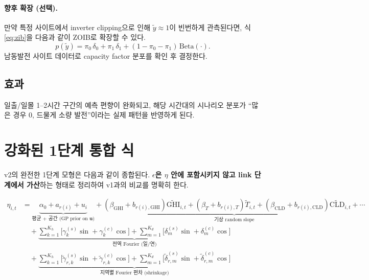 \documentclass[11pt,a4paper]{article}
\begin{document}
\paragraph{향후 확장 (선택).} 만약 특정 사이트에서 inverter clipping으로 인해 $\tilde y \approx 1$이 빈번하게 관측된다면, 식 \eqref{eq:zib}을 다음과 같이 ZOIB로 확장할 수 있다.
\begin{equation*}
    p(\tilde y) = \pi_0\,\delta_0 + \pi_1\,\delta_1 + (1-\pi_0-\pi_1)\,\mathrm{Beta}(\cdot).
\end{equation*}
남동발전 사이트 데이터로 capacity factor 분포를 확인 후 결정한다.

\subsection{효과}

일출/일몰 1--2시간 구간의 예측 편향이 완화되고, 해당 시간대의 시나리오 분포가 ``많은 경우 0, 드물게 소량 발전''이라는 실제 패턴을 반영하게 된다.

\section{강화된 1단계 통합 식}

v2의 완전한 1단계 모형은 다음과 같이 종합된다. \textbf{$\epsilon$은 $\eta$ 안에 포함시키지 않고 link 단계에서 가산}하는 형태로 정리하여 v1과의 비교를 명확히 한다.

\begin{align}
    \eta_{i,t} &= \underbrace{\alpha_0 + a_{r(i)} + u_i}_{\text{평균 + 공간 (GP prior on } \bm u)}
    + \underbrace{(\beta_{\mathrm{GHI}} + b_{r(i),\mathrm{GHI}})\widetilde{\mathrm{GHI}}_{i,t} + (\beta_T + b_{r(i),T})\widetilde T_{i,t} + (\beta_{\mathrm{CLD}}+b_{r(i),\mathrm{CLD}})\widetilde{\mathrm{CLD}}_{i,t} + \cdots}_{\text{기상 random slope}} \nonumber\\
    &\quad + \underbrace{\sum_{k=1}^{K_h}\bigl[\gamma_k^{(s)}\sin + \gamma_k^{(c)}\cos\bigr] + \sum_{m=1}^{K_d}\bigl[\delta_m^{(s)}\sin + \delta_m^{(c)}\cos\bigr]}_{\text{전역 Fourier (일/연)}} \nonumber\\
    &\quad + \underbrace{\sum_{k=1}^{K_h}\bigl[\tilde\gamma_{r,k}^{(s)}\sin + \tilde\gamma_{r,k}^{(c)}\cos\bigr] + \sum_{m=1}^{K_d}\bigl[\tilde\delta_{r,m}^{(s)}\sin + \tilde\delta_{r,m}^{(c)}\cos\bigr]}_{\text{지역별 Fourier 편차 (shrinkage)}}
    \label{eq:bayes_stage1_v2}
\end{align}
\end{document}
